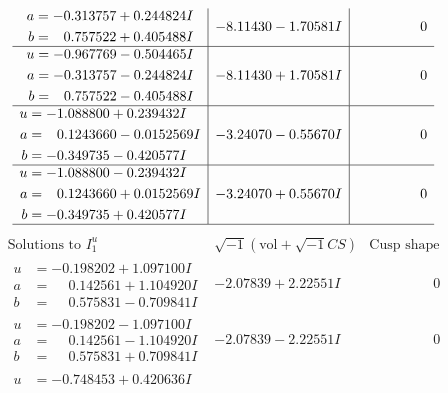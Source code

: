 \documentclass[1p]{elsarticle_modified}
\theoremstyle{definition}
\newcommand{\I}{\sqrt{-1}}
\begin{document}
$$\begin{array}{c|c|c}
\begin{aligned}
a &= -0.313757 + 0.244824 I \\
b &= \phantom{-}0.757522 + 0.405488 I\end{aligned}
 & -8.11430 - 1.70581 I & \phantom{-0.000000 } 0 \\ \hline\begin{aligned}
u &= -0.967769 - 0.504465 I \\
a &= -0.313757 - 0.244824 I \\
b &= \phantom{-}0.757522 - 0.405488 I\end{aligned}
 & -8.11430 + 1.70581 I & \phantom{-0.000000 } 0 \\ \hline\begin{aligned}
u &= -1.088800 + 0.239432 I \\
a &= \phantom{-}0.1243660 - 0.0152569 I \\
b &= -0.349735 - 0.420577 I\end{aligned}
 & -3.24070 - 0.55670 I & \phantom{-0.000000 } 0 \\ \hline\begin{aligned}
u &= -1.088800 - 0.239432 I \\
a &= \phantom{-}0.1243660 + 0.0152569 I \\
b &= -0.349735 + 0.420577 I\end{aligned}
 & -3.24070 + 0.55670 I & \phantom{-0.000000 } 0\\
 \hline 
 \end{array}$$\newpage$$\begin{array}{c|c|c}  
\text{Solutions to }I^u_{1}& \I (\text{vol} + \sqrt{-1}CS) & \text{Cusp shape}\\
 \hline 
\begin{aligned}
u &= -0.198202 + 1.097100 I \\
a &= \phantom{-}0.142561 + 1.104920 I \\
b &= \phantom{-}0.575831 - 0.709841 I\end{aligned}
 & -2.07839 + 2.22551 I & \phantom{-0.000000 } 0 \\ \hline\begin{aligned}
u &= -0.198202 - 1.097100 I \\
a &= \phantom{-}0.142561 - 1.104920 I \\
b &= \phantom{-}0.575831 + 0.709841 I\end{aligned}
 & -2.07839 - 2.22551 I & \phantom{-0.000000 } 0 \\ \hline\begin{aligned}
u &= -0.748453 + 0.420636 I \\

\end{aligned}
\end{array}$$
\end{document}
